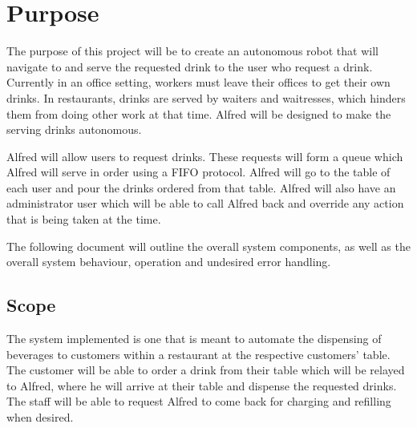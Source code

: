 \documentclass [10pt]{article}
\begin{document}


\section {Purpose}

The purpose of this project will be to create an autonomous robot that will navigate to and serve
the requested drink to the user who request a drink. Currently in an office setting, workers must
leave their offices to get their own drinks. In restaurants, drinks are served by waiters and
waitresses, which hinders them from doing other work at that time. Alfred will be designed to make the serving drinks autonomous.\newline

Alfred will allow users to request drinks. These requests will form a queue which Alfred will serve in order using a FIFO protocol. Alfred will go to the table of each user and pour the drinks ordered from that table. Alfred will also have an administrator user which will be able to call Alfred back and override any action that is being taken at the time.\newline

The following document will outline the overall system components, as well as the overall system behaviour, operation and undesired error handling.


\subsection{Scope}

The system implemented is one that is meant to automate the dispensing of beverages to customers within a restaurant at the respective customers' table. The customer will be able to order a drink from their table which will be relayed to Alfred, where he will arrive at their table and dispense the requested drinks. The staff will be able to request Alfred to come back for charging and refilling when desired.


\end{document}
